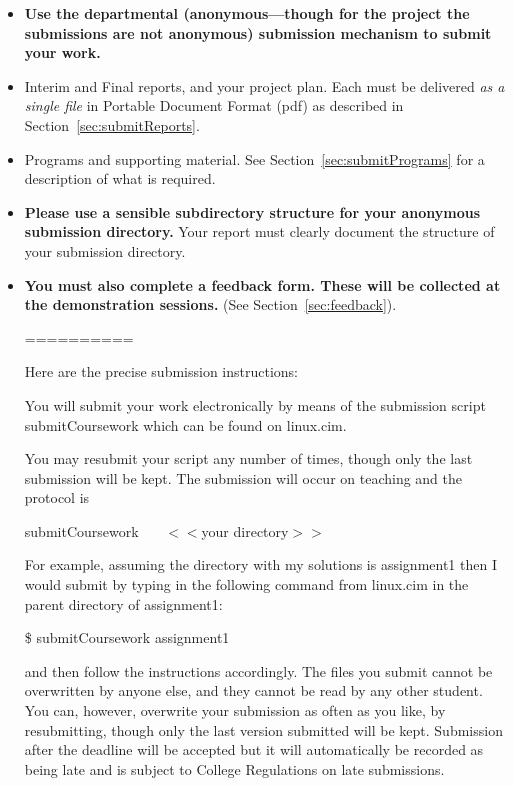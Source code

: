 \documentclass[11pt]{article}
\begin{document}
\begin{itemize}
\item \textbf{Use the departmental (anonymous---though for the project the submissions are not anonymous) submission mechanism to submit your work.}

\item Interim and Final reports, and your project plan.  Each must be delivered \emph{as a single file} in Portable Document Format (pdf)  as described in Section~\ref{sec:submitReports}.

\item Programs and supporting material.  See Section~\ref{sec:submitPrograms} for a description of what is required.

\item \textbf{Please use a sensible subdirectory structure for your anonymous submission directory.}  Your report must clearly document the structure of your submission directory.
\item \textbf{You must also complete a feedback form. These will be collected at the demonstration sessions.} (See Section~\ref{sec:feedback}).


==========


 

Here are the precise submission instructions:

 

You will submit your work electronically by means of the submission script \mbox{submitCoursework} which can be found on linux.cim.

You may resubmit your script any number of times, though only the last submission will be kept.
The submission will occur on teaching and the protocol is

submitCoursework ~~~$<< $your directory$>>$

 

For example, assuming the directory with my solutions is assignment1 then I would submit by typing in the following command from linux.cim in the parent directory of assignment1:

\$ submitCoursework assignment1

and then follow the instructions accordingly. The files you submit cannot be overwritten by anyone else, and they cannot
be read by any other student. You can, however, overwrite your submission as often as you like, by resubmitting, though only the last version submitted will be kept. Submission after the deadline will be accepted but it will automatically be recorded as being late and is subject to College Regulations on late submissions. 

\end{itemize}
\end{document}
